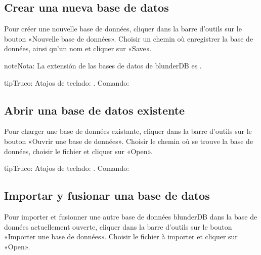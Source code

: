 \documentclass[letterpaper,10pt,spanish]{sphinxmanual}
\begin{document}
\subsection{Crear una nueva base de datos}
\label{\detokenize{guide_utilisateur:creer-une-nouvelle-base-de-donnees}}
\sphinxAtStartPar
Pour créer une nouvelle base de données, cliquer dans la barre d’outils sur le
bouton «Nouvelle base de données». Choisir un chemin où enregistrer la base de
données, ainsi qu’un nom et cliquer sur «Save».

\begin{sphinxadmonition}{note}{Nota:}
\sphinxAtStartPar
La extensión de las bases de datos de blunderDB es .
\end{sphinxadmonition}

\begin{sphinxadmonition}{tip}{Truco:}
\sphinxAtStartPar
Atajos de teclado: . Comando: 
\end{sphinxadmonition}


\subsection{Abrir una base de datos existente}
\label{\detokenize{guide_utilisateur:ouvrir-une-base-de-donnee-existante}}
\sphinxAtStartPar
Pour charger une base de données existante, cliquer dans la barre d’outils sur
le bouton «Ouvrir une base de données». Choisir le chemin où se trouve la base
de données, choisir le fichier  et cliquer sur «Open».

\begin{sphinxadmonition}{tip}{Truco:}
\sphinxAtStartPar
Atajos de teclado: . Comando: 
\end{sphinxadmonition}


\subsection{Importar y fusionar una base de datos}
\label{\detokenize{guide_utilisateur:importer-et-fusionner-une-base-de-donnees}}
\sphinxAtStartPar
Pour importer et fusionner une autre base de données blunderDB dans la base de
données actuellement ouverte, cliquer dans la barre d’outils sur le bouton
«Importer une base de données». Choisir le fichier  à importer et
cliquer sur «Open».
\end{document}
